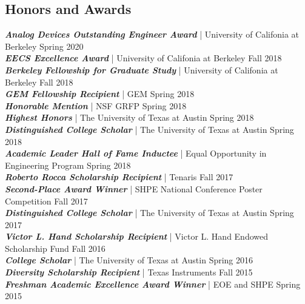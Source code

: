 \documentclass[letter]{res}
\begin{document}
\begin{resume}
\section{Honors and Awards}
{\sl \textbf{Analog Devices Outstanding Engineer Award}} | University of Califonia at Berkeley \hfill Spring 2020\\
{\sl \textbf{EECS Excellence Award}} | University of Califonia at Berkeley \hfill Fall 2018\\
{\sl \textbf{Berkeley Fellowship for Graduate Study}} | University of Califonia at Berkeley \hfill Fall 2018\\
{\sl \textbf{GEM Fellowship Recipient}} | GEM \hfill Spring 2018\\
{\sl \textbf{Honorable Mention}} | NSF GRFP \hfill Spring 2018\\
{\sl \textbf{Highest Honors}} | The University of Texas at Austin  \hfill Spring 2018\\
{\sl \textbf{Distinguished College Scholar}} | The University of Texas at Austin  \hfill Spring 2018\\
{\sl \textbf{Academic Leader Hall of Fame Inductee}} | Equal Opportunity in Engineering Program  \hfill Spring 2018\\
{\sl \textbf{Roberto Rocca Scholarship Recipient}} | Tenaris \hfill Fall 2017\\
{\sl \textbf{Second-Place Award Winner}} | SHPE National Conference Poster Competition  \hfill Fall 2017\\
{\sl \textbf{Distinguished College Scholar}} | The University of Texas at Austin  \hfill Spring 2017\\
{\sl \textbf{Victor L. Hand Scholarship Recipient}} | Victor L. Hand Endowed Scholarship Fund \hfill Fall 2016\\
{\sl \textbf{College Scholar}} | The University of Texas at Austin \hfill Spring 2016\\
{\sl \textbf{Diversity Scholarship Recipient}} | Texas Instruments \hfill Fall 2015\\
{\sl \textbf{Freshman Academic Excellence Award Winner}} | EOE and SHPE \hfill Spring 2015\\

\end{resume}
\end{document}
